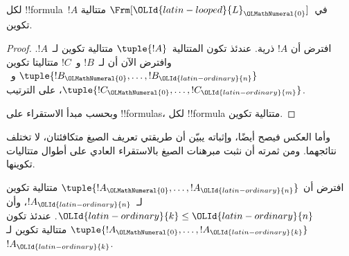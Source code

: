 \documentclass[../../../include/open-logic-section]{subfiles}
\begin{document}
\begin{prop}
لكل !!{formula}~$!A$ في~$\Frm[\OLId{latin-looped}{L}_\OLMathNumeral{0}]$ متتالية تكوين.
\end{prop}

\begin{proof}
افترض أن $!A$ ذرية. عندئذ تكون المتتالية~$\tuple{!A}$ متتالية
تكوين لـ~$!A$.
%
وافترض الآن أن لـ~$!B$ و~$!C$ متتاليتا تكوين
$\tuple{!B_\OLMathNumeral{0},\dotsc,!B_\OLId{latin-ordinary}{n}}$ و~$\tuple{!C_\OLMathNumeral{0},\dotsc,!C_\OLId{latin-ordinary}{m}}$،
على الترتيب.
%
\begin{enumerate}
\end{enumerate}
وبحسب مبدأ الاستقراء على !!{formula}s، لكل
!!{formula} متتالية تكوين.
\end{proof}

وأما العكس فيصح أيضًا، وإثباته يبيّن أن طريقتي تعريف الصيغ متكافئتان، لا تختلف نتائجهما. ومن ثمرته أن نثبت مبرهنات الصيغ بالاستقراء العادي على أطوال متتاليات تكوينها.

\begin{lem}
افترض أن $\tuple{!A_\OLMathNumeral{0},\dotsc,!A_\OLId{latin-ordinary}{n}}$ متتالية تكوين لـ~$!A_\OLId{latin-ordinary}{n}$، وأن
$\OLId{latin-ordinary}{k} \leq \OLId{latin-ordinary}{n}$. عندئذ تكون $\tuple{!A_\OLMathNumeral{0},\dotsc,!A_\OLId{latin-ordinary}{k}}$ متتالية تكوين
لـ~$!A_\OLId{latin-ordinary}{k}$.
\end{lem}
\end{document}
